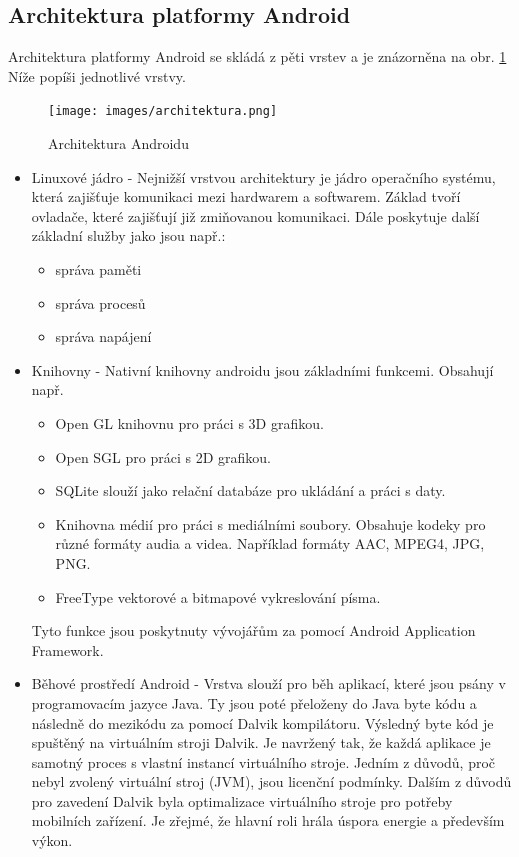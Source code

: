 \documentclass[12pt]{article}
\begin{document}
\newpage
\subsection{Architektura platformy Android}
Architektura platformy Android se skládá z pěti vrstev a je znázorněna na obr. \ref{architektura} Níže popíši jednotlivé vrstvy.
\begin{figure}[ht]
\centerline{\texttt{[image: images/architektura.png]}}
\caption{Architektura Androidu\cite{architektura}} \label{architektura}
\end{figure}

\begin{itemize}
\item Linuxové jádro - Nejnižší vrstvou architektury je jádro operačního systému, která zajišťuje komunikaci mezi hardwarem a softwarem. Základ tvoří ovladače, které zajišťují již zmiňovanou komunikaci. Dále poskytuje další základní služby jako jsou např.:
\begin{itemize}
\item správa paměti
\item správa procesů
\item správa napájení
\end{itemize}
\item Knihovny - Nativní knihovny androidu jsou základními funkcemi. Obsahují např. 
\begin{itemize}
\item Open GL knihovnu pro práci s 3D grafikou.
\item Open SGL pro práci s 2D grafikou.
\item SQLite slouží jako relační databáze pro ukládání a práci s daty.
\item Knihovna médií pro práci s mediálními soubory. Obsahuje kodeky pro různé formáty audia a videa. Například formáty AAC, MPEG4, JPG, PNG.
\item FreeType vektorové a bitmapové vykreslování písma.
\end{itemize}
Tyto funkce jsou poskytnuty vývojářům za pomocí Android Application Framework.
\item Běhové prostředí Android - Vrstva slouží pro běh aplikací, které jsou psány v programovacím jazyce Java. Ty jsou poté přeloženy do Java byte kódu a následně do mezikódu za pomocí Dalvik kompilátoru. Výsledný byte kód je spuštěný na virtuálním stroji Dalvik. Je navržený tak, že každá aplikace je samotný proces s vlastní instancí virtuálního stroje. Jedním z důvodů, proč nebyl zvolený virtuální stroj (JVM), jsou licenční podmínky. Dalším z důvodů pro zavedení Dalvik byla optimalizace virtuálního stroje pro potřeby mobilních zařízení. Je zřejmé, že hlavní roli hrála úspora energie a především výkon.

\end{itemize}
\end{document}
